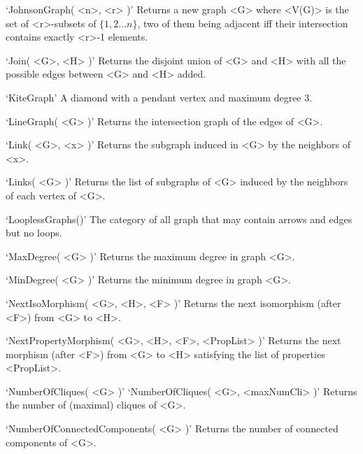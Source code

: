 `JohnsonGraph( <n>, <r> )'\newline\hglue 5mm 
Returns a new graph <G> where <V(G)> is the set of <r>-subsets of $\{1,2 \ldots n\}$, two of them being adjacent iff their intersection contains exactly <r>-1 elements.

`Join( <G>, <H> )'\newline\hglue 5mm 
Returns the disjoint union of <G> and <H> with all the possible edges between <G> and <H> added.

`KiteGraph'\newline\hglue 5mm 
A diamond with a pendant vertex and maximum degree 3.

`LineGraph( <G> )'\newline\hglue 5mm 
Returns the intersection graph of the edges of <G>.

`Link( <G>, <x> )'\newline\hglue 5mm 
Returns the subgraph induced in <G> by the neighbors of <x>.

`Links( <G> )'\newline\hglue 5mm 
Returns  the  list  of  subgraphs  of <G> induced by the neighbors of each vertex of <G>.

`LooplessGraphs()'\newline\hglue 5mm 
The category of all graph that may contain arrows and edges but no loops.

`MaxDegree( <G> )'\newline\hglue 5mm 
Returns the maximum degree in graph <G>.

`MinDegree( <G> )'\newline\hglue 5mm 
Returns the minimum degree in graph <G>.

`NextIsoMorphism( <G>, <H>, <F> )'\newline\hglue 5mm 
Returns the next isomorphism  (after <F>) from <G> to <H>.

`NextPropertyMorphism( <G>, <H>, <F>, <PropList> )'\newline\hglue 5mm 
Returns the next morphism (after <F>) from <G> to <H> satisfying  the  list  of  properties  <PropList>.

`NumberOfCliques( <G> )'\newline
`NumberOfCliques( <G>, <maxNumCli> )'\newline\hglue 5mm 
Returns  the  number of (maximal) cliques of <G>.

`NumberOfConnectedComponents( <G> )'\newline\hglue 5mm 
Returns the number of connected components of <G>.

